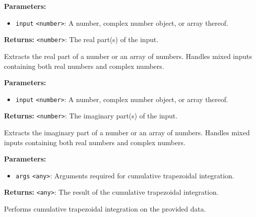 \documentclass[12pt,a4paper]{article}
\begin{document}
\noindent \textbf{Parameters:}
\begin{itemize}
  \item \texttt{input} \texttt{<number>}: A number, complex number object, or array thereof.
\end{itemize}

\noindent \textbf{Returns:} \texttt{<number>}: The real part(s) of the input.

\noindent Extracts the real part of a number or an array of numbers.
Handles mixed inputs containing both real numbers and complex numbers.

\vspace{5mm}
\noindent {}


\noindent \textbf{Parameters:}
\begin{itemize}
  \item \texttt{input} \texttt{<number>}: A number, complex number object, or array thereof.
\end{itemize}

\noindent \textbf{Returns:} \texttt{<number>}: The imaginary part(s) of the input.

\noindent Extracts the imaginary part of a number or an array of numbers.
Handles mixed inputs containing both real numbers and complex numbers.

\vspace{5mm}
\noindent {}


\noindent \textbf{Parameters:}
\begin{itemize}
  \item \texttt{args} \texttt{<any>}: Arguments required for cumulative trapezoidal integration.
\end{itemize}

\noindent \textbf{Returns:} \texttt{<any>}: The result of the cumulative trapezoidal integration.

\noindent Performs cumulative trapezoidal integration on the provided data.

\vspace{5mm}
\noindent {}
\end{document}
